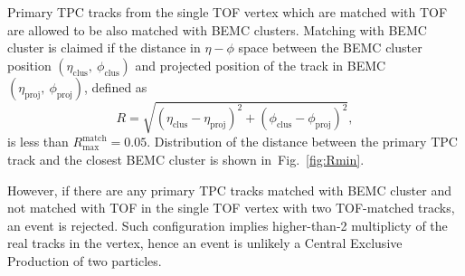 Primary TPC tracks from the single TOF vertex which are matched with TOF are allowed to be also matched with BEMC clusters. Matching with BEMC cluster is claimed if the distance in $\eta-\phi$ space between the BEMC cluster position $(\eta_{\text{clus}},~\phi_{\text{clus}})$ and projected position of the track in BEMC $(\eta_{\text{proj}},~\phi_{\text{proj}})$, defined as
\begin{equation}
 R=\sqrt{(\eta_{\text{clus}}-\eta_{\text{proj}})^{2} + (\phi_{\text{clus}}-\phi_{\text{proj}})^{2}},
\end{equation}
is less than $R^{\text{match}}_{\text{max}} = 0.05$. Distribution of the distance between the primary TPC track and the closest BEMC cluster is shown in~Fig.~\ref{fig:Rmin}.

However, if there are any primary TPC tracks matched with BEMC cluster and not matched with TOF in the single TOF vertex with two TOF-matched tracks, an event is rejected. Such configuration implies higher-than-2 multiplicty of the real tracks in the vertex, hence an event is unlikely a Central Exclusive Production of two particles.



